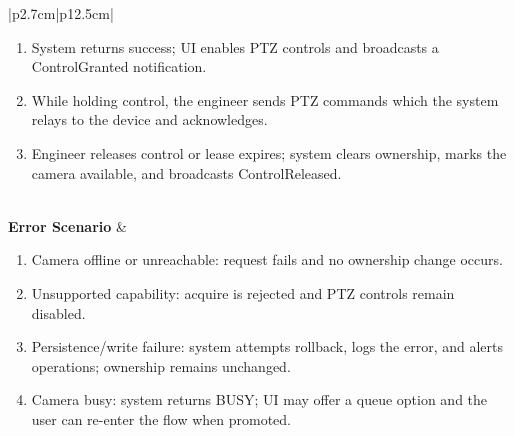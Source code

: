 \begin{table}[H]
\begin{tabular}{|p{2.7cm}|p{12.5cm}|}
\begin{minipage}[t]{\linewidth}
\begin{enumerate}[topsep=0pt,itemsep=1pt,parsep=0pt,partopsep=0pt]
                \item System returns success; UI enables PTZ controls and broadcasts a ControlGranted notification.
                \item While holding control, the engineer sends PTZ commands which the system relays to the device and acknowledges.
                \item Engineer releases control or lease expires; system clears ownership, marks the camera available, and broadcasts ControlReleased.
            \end{enumerate}
        \end{minipage} \\
        \hline
        \textbf{Error Scenario} & \begin{minipage}[t]{\linewidth}
            \begin{enumerate}[topsep=0pt,itemsep=1pt,parsep=0pt,partopsep=0pt]
                \item Camera offline or unreachable: request fails and no ownership change occurs.
                \item Unsupported capability: acquire is rejected and PTZ controls remain disabled.
                \item Persistence/write failure: system attempts rollback, logs the error, and alerts operations; ownership remains unchanged.
                \item Camera busy: system returns BUSY; UI may offer a queue option and the user can re-enter the flow when promoted.
            \end{enumerate}
        \end{minipage} \\
        \hline
    \end{tabular}
    \label{tab:eng-acquire-release-camera}
\end{table}





















